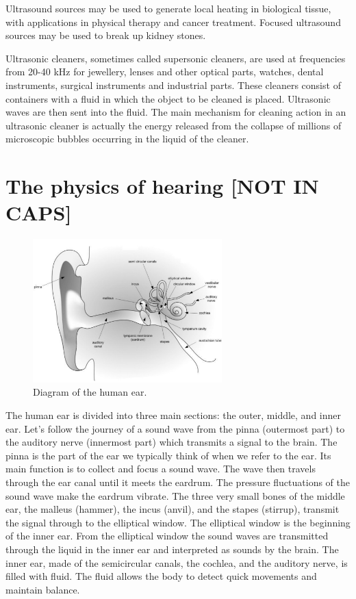 \label{m38800*id185154}Ultrasound sources may be used to generate local heating in biological tissue, with applications in physical therapy and cancer treatment. Focused ultrasound sources may be used to break up kidney stones.\par 
      \label{m38800*id185159}Ultrasonic cleaners, sometimes called supersonic cleaners, are used at frequencies from 20-40 kHz for jewellery, lenses and other optical parts, watches, dental instruments, surgical instruments and industrial parts.
These cleaners consist of containers with a fluid in which the object to be cleaned is placed. Ultrasonic waves are then sent into the fluid. The main mechanism for cleaning action in an ultrasonic cleaner is actually the energy released from the collapse of millions of microscopic bubbles occurring in the liquid of the cleaner.\par 
\label{m38800*notfhsst!!!underscore!!!id482}


\section*{The physics of hearing [NOT IN CAPS]}
            \nopagebreak
\begin{figure}[H]
\begin{center}
\includegraphics[width=0.65\textwidth]{HumanEar-GrayScale.pdf}
\end{center}
\caption{Diagram of the human ear. }
\label{Human Ear}
\end{figure}


      \label{m38800*id184052}The human ear is divided into three main sections: the outer, middle,
and inner ear. Let's follow the journey of a sound wave from the pinna (outermost part) to the auditory nerve (innermost part) which transmits a signal to the brain. The pinna is the part of the ear we typically think of when we refer to the ear. Its main
function is to collect and focus a sound wave. The wave
then travels through the ear canal until it meets the eardrum. The
pressure fluctuations of the sound wave make the eardrum vibrate.
The three very small bones of the middle ear, the malleus (hammer),
the incus (anvil), and the stapes (stirrup), transmit the signal through
to the elliptical window. The elliptical window is the beginning of the
inner ear. From the elliptical window the sound waves are transmitted through the liquid
in the inner ear and interpreted as sounds by the brain.
The inner ear, made of the semicircular canals, the cochlea,
and the auditory nerve, is filled with fluid. The fluid allows the body to
detect quick movements and maintain balance. 


